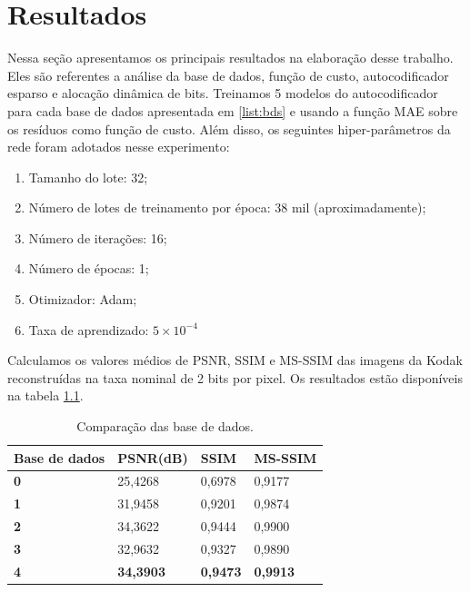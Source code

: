 
\chapter{Resultados}
Nessa seção apresentamos os principais resultados na elaboração desse trabalho. Eles são referentes a análise da base de dados, função de custo, autocodificador esparso e alocação dinâmica de bits. 
Treinamos 5 modelos do autocodificador para cada base de dados apresentada em \ref{list:bds} e usando a função MAE sobre os resíduos como função de custo. Além disso, os seguintes hiper-parâmetros da rede foram adotados nesse experimento: 

\begin{enumerate}
	\label{enum:hiper_param}
	\item Tamanho do lote: 32; 
	\item Número de lotes de treinamento por época: 38 mil (aproximadamente);   
	\item Número de iterações: 16;
	\item Número de épocas: 1;
	\item Otimizador: Adam;
	\item Taxa de aprendizado: $5 \times {10}^{-4}$
\end{enumerate}

Calculamos os valores médios de PSNR, SSIM e MS-SSIM das imagens da Kodak reconstruídas na taxa nominal de 2 bits por pixel. Os resultados estão disponíveis na tabela \ref{table:comp_datasets}.


\begin{table}[htbp]
	\centering
	\caption{Comparação das base de dados.}
	\begin{tabular}{|l|l|l|l|}
		\hline
		\textbf{Base de dados} & \textbf{PSNR(dB)}    & \textbf{SSIM}   & \textbf{MS-SSIM}\\\hline
		\textbf{0}            & 25,4268          & 0,6978          & 0,9177           \\\hline
		\textbf{1}            & 31,9458          & 0,9201          & 0,9874           \\\hline
		\textbf{2}            & 34,3622          & 0,9444          & 0,9900           \\\hline
		\textbf{3}            & 32,9632	       & 0,9327          & 0,9890           \\\hline
		\textbf{4}            & \textbf{34,3903} & \textbf{0,9473} & \textbf{0,9913}     
		\\ \hline
	\end{tabular}
	\label{table:comp_datasets}
\end{table}

